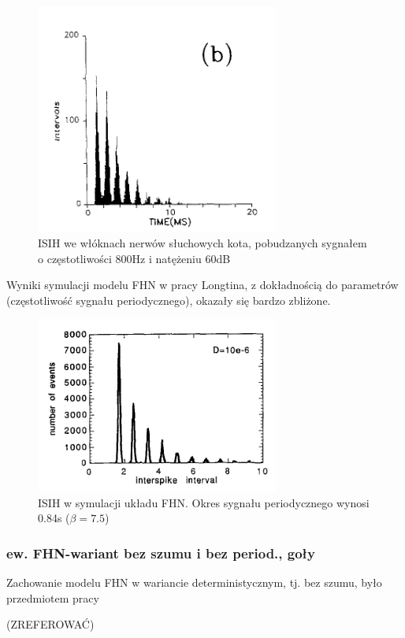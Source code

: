   \begin{figure}
    \includegraphics[width=80mm]{images/longtin_fig1b.png}
    \caption{ISIH we włóknach nerwów słuchowych kota, pobudzanych sygnałem o częstotliwości 800Hz i natężeniu 60dB}
  \end{figure}

  Wyniki symulacji modelu FHN w pracy Longtina, z dokładnością do parametrów (częstotliwość sygnału periodycznego), okazały się bardzo zbliżone.

  \begin{figure}
    \includegraphics[width=80mm]{images/longtin_fig5a.png}
    \caption{ISIH w symulacji układu FHN. Okres sygnału periodycznego wynosi 0.84s ($\beta = 7.5$)}
  \end{figure}  



  \subsubsection{ew. FHN-wariant bez szumu i bez period., goły}

  Zachowanie modelu FHN w wariancie deterministycznym, tj. bez szumu, było przedmiotem pracy \cite{alexander}

  (ZREFEROWAĆ)

